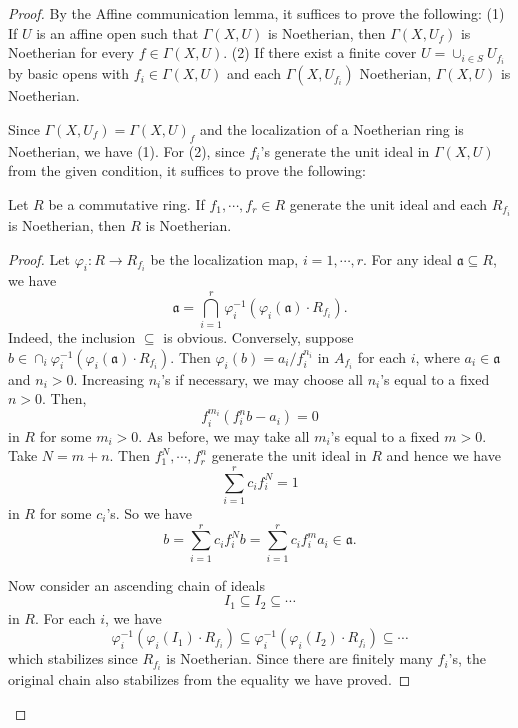 \documentclass{article}
\begin{document}
\begin{proof}
By the Affine communication lemma, it suffices to prove the following:
(1) If $U$ is an affine open such that $\Gamma(X,U)$ is Noetherian, then $\Gamma(X,U_f)$ is Noetherian for every $f \in \Gamma(X,U)$.
(2) If there exist a finite cover $U = \cup_{i \in S} U_{f_i}$ by basic opens with $f_i \in \Gamma(X,U)$ and each $\Gamma(X,U_{f_i})$ Noetherian, $\Gamma(X,U)$ is Noetherian.

Since $\Gamma(X,U_f) = \Gamma(X,U)_f$ and the localization of a Noetherian ring is Noetherian, we have (1).
For (2), since $f_i$'s generate the unit ideal in $\Gamma(X,U)$ from the given condition, it suffices to prove the following:
\begin{claim} 
Let $R$ be a commutative ring. If $f_1,\cdots,f_r \in R$ generate the unit ideal and each $R_{f_i}$ is Noetherian, then $R$ is Noetherian.
\end{claim}

\begin{proof}
Let $\varphi_i:R \to R_{f_i}$ be the localization map, $i=1,\cdots,r$. For any ideal $\mathfrak{a} \subseteq R$, we have
\[
\mathfrak{a} = \bigcap_{i=1}^r \varphi_i^{-1} (\varphi_i(\mathfrak{a}) \cdot R_{f_i}).
\]
Indeed, the inclusion $\subseteq$ is obvious. Conversely, suppose $b \in \cap_i \varphi_i^{-1} (\varphi_i(\mathfrak{a}) \cdot R_{f_i})$. Then $\varphi_i(b) = a_i/f_i^{n_i}$ in $A_{f_i}$ for each $i$, where $a_i \in \mathfrak{a}$ and $n_i >0$. Increasing $n_i$'s if necessary, we may choose all $n_i$'s equal to a fixed $n>0$. Then,
\[
f_i^{m_i}(f_i^n b - a_i) = 0
\]
in $R$ for some $m_i >0$. As before, we may take all $m_i$'s equal to a fixed $m>0$. Take $N=m+n$. Then $f_1^N,\cdots,f_r^n$ generate the unit ideal in $R$ and hence we have
\[ \sum_{i=1}^r c_i f_i^N = 1
\]
in $R$ for some $c_i $'s. So we have
\[
b = \sum_{i=1}^r c_i f_i^N b =  \sum_{i=1}^r c_i f_i^m a_i \in \mathfrak{a}.
\]

Now consider an ascending chain of ideals
\[
I_1 \subseteq I_2 \subseteq \cdots
\]
in $R$. For each $i$, we have
\[
\varphi_i^{-1} (\varphi_i(I_1) \cdot R_{f_i}) \subseteq \varphi_i^{-1} (\varphi_i(I_2) \cdot R_{f_i}) \subseteq \cdots
\]
which stabilizes since $R_{f_i}$ is Noetherian. Since there are finitely many $f_i$'s, the original chain also stabilizes from the equality we have proved.
\end{proof}
\end{proof}
\end{document}
